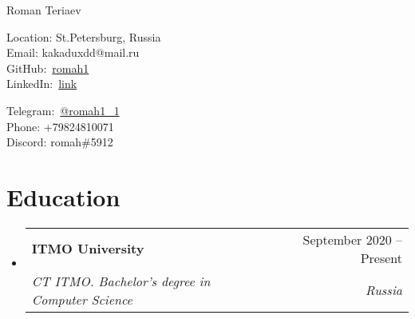 \documentclass[letterpaper,10pt]{article}
\makeatletter
\newcommand{\resumeSubheading}[4]{
  \vspace{-2pt}\item
    \begin{tabular*}{0.97\textwidth}[t]{l@{\extracolsep{\fill}}r}
      \textbf{#1} & #2 \\
      \textit{\small#3} & \textit{\small #4} \\
    \end{tabular*}\vspace{-7pt}
}
\newcommand{\resumeSubHeadingListStart}{\begin{itemize}[leftmargin=0.15in, label={}]}
\newcommand{\resumeSubHeadingListEnd}{\end{itemize}}
\makeatother
\begin{document}
\begin{center}
    {\LARGE Roman Teriaev} \\ \vspace{2pt}
    \begin{multicols}{2}
    \begin{flushleft}
    Location: St.Petersburg, Russia\\
    Email: kakaduxdd@mail.ru\\
    GitHub:\
    \href{{https://github.com/romah1}}{\color{blue}romah1}\\
    LinkedIn:\
    \href{{https://www.linkedin.com/in/roman-teriaev-939b06250/}}{\color{blue}link}\\
    \end{flushleft}
    
    \begin{flushright}
    Telegram:\
    \href{{https://t.me/romah1_1}}{\color{blue}@romah1\_1}\\
    Phone: +79824810071\\
    Discord: romah\#5912\\
    \end{flushright}
    \end{multicols}
\end{center}


\vspace{-2pt}
\section{Education}
  \resumeSubHeadingListStart
      \resumeSubheading
      {ITMO University}{September 2020 -- Present}
      {CT ITMO. Bachelor's degree in Computer Science}{Russia}

  \resumeSubHeadingListEnd


\end{document}
